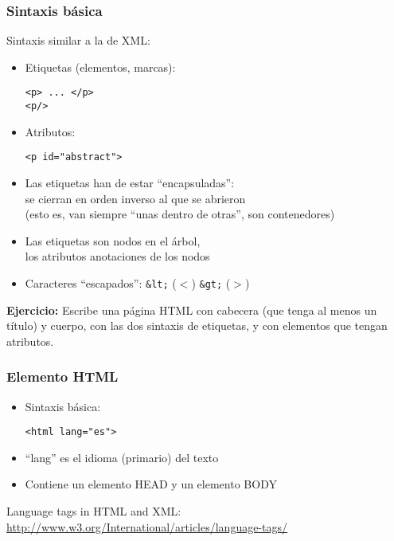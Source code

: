 \begin{frame}[fragile]
\frametitle{Sintaxis básica}

Sintaxis similar a la de XML:

\begin{itemize}
\item Etiquetas (elementos, marcas): 
\begin{verbatim}
<p> ... </p> 
<p/>
\end{verbatim}

\item Atributos: 
\begin{verbatim}
<p id="abstract">
\end{verbatim}
\item Las etiquetas han de estar ``encapsuladas'': \\
  se cierran en orden inverso al que se abrieron \\
  (esto es, van siempre ``unas dentro de otras'', son contenedores)
\item Las etiquetas son nodos en el árbol, \\
  los atributos anotaciones de los nodos
\item Caracteres ``escapados'': \verb|&lt;| ($<$) \verb|&gt;| ($>$)
\end{itemize}

\textbf{Ejercicio:} Escribe una página HTML con cabecera (que tenga al menos un título) y cuerpo, con las dos sintaxis de etiquetas, y con elementos que tengan atributos.

\end{frame}


\begin{frame}[fragile]
\frametitle{Elemento HTML}

\begin{itemize}
\item Sintaxis básica:

\begin{verbatim}
<html lang="es">
\end{verbatim}

\item ``lang'' es el idioma (primario) del texto

\item Contiene un elemento HEAD y un elemento BODY
\end{itemize}

\begin{flushright}
Language tags in HTML and XML: \\
\url{http://www.w3.org/International/articles/language-tags/} \\
\end{flushright}
\end{frame}

